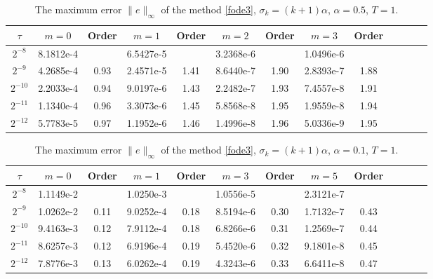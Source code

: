 \documentclass[10pt]{siamltex}
\begin{document}
\begin{table}[!h]
\caption{{The maximum error $\|e\|_{\infty}$ of the method \eqref{fode3}, $\sigma_k=(k+1)\alpha$,  $\alpha=0.5$,  ${T=1}$.}}\label{tb6-1-1}
\centering\footnotesize
\begin{tabular}{|c|c|c|c|c|c|c|c|c|c|c|c|c|}
\hline
 $\tau$ & $m=0$ & Order& $m=1$ & Order& $m=2$ & Order & $m=3$   & Order\\
 \hline
$2^{-8}$ &8.1812e-4&    &6.5427e-5&    &3.2368e-6&    &1.0496e-6&    \\
$2^{-9}$ &4.2685e-4&0.93&2.4571e-5&1.41&8.6440e-7&1.90&2.8393e-7&1.88\\
$2^{-10}$&2.2033e-4&0.94&9.0197e-6&1.43&2.2482e-7&1.93&7.4557e-8&1.91\\
$2^{-11}$&1.1340e-4&0.96&3.3073e-6&1.45&5.8568e-8&1.95&1.9559e-8&1.94\\
$2^{-12}$&5.7783e-5&0.97&1.1952e-6&1.46&1.4996e-8&1.96&5.0336e-9&1.95\\
\hline
\end{tabular}
\end{table}

\begin{table}[!h]
\caption{{The maximum error $\|e\|_{\infty}$ of the method \eqref{fode3},  $\sigma_k=(k+1)\alpha$,  $\alpha=0.1$, ${T=1}$.}}\label{tb6-3-1}
\centering\footnotesize
\begin{tabular}{|c|c|c|c|c|c|c|c|c|c|c|c|c|}
\hline
 $\tau$ & $m=0$ & Order& $m=1$ & Order& $m=3$ & Order & $m=5$   & Order\\
 \hline
$2^{-8}$ &1.1149e-2&    &1.0250e-3&    &1.0556e-5&    &2.3121e-7&     \\
$2^{-9}$ &1.0262e-2&0.11&9.0252e-4&0.18&8.5194e-6&0.30&1.7132e-7&0.43 \\
$2^{-10}$&9.4163e-3&0.12&7.9112e-4&0.18&6.8266e-6&0.31&1.2569e-7&0.44 \\
$2^{-11}$&8.6257e-3&0.12&6.9196e-4&0.19&5.4520e-6&0.32&9.1801e-8&0.45 \\
$2^{-12}$&7.8776e-3&0.13&6.0262e-4&0.19&4.3243e-6&0.33&6.6411e-8&0.47 \\
\hline
\end{tabular}
\end{table}
\end{document}
